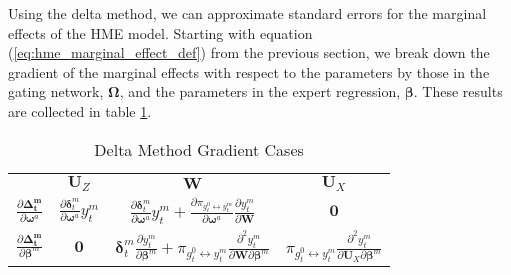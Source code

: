 \documentclass[12pt]{article}
\newcommand{\gateprod}[2]{\pi_{#1 \longleftrightarrow #2}}
\begin{document}
Using the delta method, we can approximate standard
errors for the marginal effects of the HME model. Starting with equation
(\ref{eq:hme_marginal_effect_def}) from the previous section, we break down
the gradient of the marginal effects with respect to the parameters by those 
in the gating network, $\boldsymbol{\Omega}$, and the parameters in the
expert regression, $\boldsymbol{\beta}$. These results are collected in table
 \ref{tbl:delta_method_gradients}.

\begin{table}
  \begin{center}
    \begin{tabular}{| l | c c c |}
    \hline
                                                                                    & \underline{$\boldsymbol{U}_{Z}$}                                                            & \underline{$\boldsymbol{W}$}                                                                                                                                                                                           & \underline{$\boldsymbol{U}_{X}$}   \\ [2ex]
    $\frac{\partial \boldsymbol{\Delta_{t}^{m}}}{\partial \boldsymbol{\omega}^{a}}$ & $\frac{\partial \boldsymbol{\delta}^{m}_{t}}{\partial \boldsymbol{\omega}^{a}} y^{m}_{t}$   & $\frac{\partial \boldsymbol{\delta}^{m}_{t}}{\partial \boldsymbol{\omega}^{a}} y^{m}_{t} + \frac{\partial \gateprod{g^{0}_{t}}{y^{m}_{t}}}{\partial \boldsymbol{\omega}^{a}}  \frac{\partial y^{m}_{t}}{{\partial \boldsymbol{W}}}$                                           & $\boldsymbol{0}$                   \\ [2ex]
    $\frac{\partial \boldsymbol{\Delta_{t}^{m}}}{\partial \boldsymbol{\beta}^{m}}$  & $\boldsymbol{0}$                                                                            & $\boldsymbol{\delta}^{m}_{t} \frac{\partial y^{m}_{t}}{\partial \boldsymbol{\beta}^{m}} + \gateprod{g^{0}_{t}}{y^{m}_{t}}   \frac{\partial^{2} y^{m}_{t}}{\partial \boldsymbol{W} \partial \boldsymbol{\beta}^{m}}$    & $\gateprod{g^{0}_{t}}{y^{m}_{t}}  \frac{\partial^{2} y^{m}_{t}}{\partial \boldsymbol{U}_{X} \partial \boldsymbol{\beta}^{m}}$  \\ [1ex]
    \hline
    \end{tabular}
  \caption{\label{tbl:delta_method_gradients} Delta Method Gradient Cases}
  \end{center}
\end{table}
\end{document}
